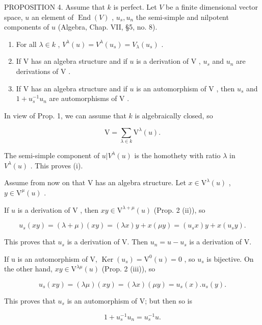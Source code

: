 PROPOSITION 4. Assume that \(k\) is perfect. Let \(V\) be a finite dimensional vector space, \(u\) an element of \(\operatorname{End}(V)\) , \(u_s, u_n\) the semi-simple and nilpotent components of \(u\) (Algebra, Chap. VII, §5, no. 8).

\begin{enumerate}
\def\labelenumi{(\roman{enumi})}
\item
  For all \(\lambda \in k\) , \(V^{\lambda}(u) = V^{\lambda}(u_s) = V_{\lambda}(u_s)\) .
\item
  If \(\mathrm{V}\) has an algebra structure and if \(u\) is a derivation of \(\mathrm{V}\) , \(u_{s}\) and \(u_{n}\) are derivations of \(\mathrm{V}\) .
\item
  If \(\mathrm{V}\) has an algebra structure and if \(u\) is an automorphism of \(\mathrm{V}\) , then \(u_{s}\) and \(1 + u_{s}^{-1}u_{n}\) are automorphisms of \(\mathrm{V}\) .
\end{enumerate}

In view of Prop. 1, we can assume that \(k\) is algebraically closed, so

\[
\mathrm{V} = \sum_ {\lambda \in k} \mathrm{V} ^ {\lambda} (u).
\]

The semi-simple component of \(u|V^{\lambda}(u)\) is the homothety with ratio \(\lambda\) in \(V^{\lambda}(u)\) . This proves (i).

Assume from now on that \(\mathrm{V}\) has an algebra structure. Let \(x \in \mathrm{V}^{\lambda}(u)\) , \(y \in \mathrm{V}^{\mu}(u)\) .

If \(u\) is a derivation of \(\mathrm{V}\) , then \(xy \in \mathrm{V}^{\lambda + \mu}(u)\) (Prop. 2 (ii)), so

\[
u _ {s} (x y) = (\lambda + \mu) (x y) = (\lambda x) y + x (\mu y) = (u _ {s} x) y + x (u _ {s} y).
\]

This proves that \(u_{s}\) is a derivation of V. Then \(u_{n} = u - u_{s}\) is a derivation of V.

If u is an automorphism of V, \(\operatorname{Ker}(u_{s}) = \mathrm{V}^{0}(u) = 0\) , so \(u_{s}\) is bijective. On the other hand, \(xy \in \mathrm{V}^{\lambda\mu}(u)\) (Prop. 2 (iii)), so

\[
u _ {s} (x y) = (\lambda \mu) (x y) = (\lambda x) (\mu y) = u _ {s} (x). u _ {s} (y).
\]

This proves that \(u_{s}\) is an automorphism of V; but then so is

\[
1 + u _ {s} ^ {- 1} u _ {n} = u _ {s} ^ {- 1} u.
\]

